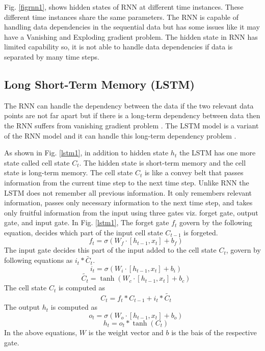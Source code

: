 \documentclass[preprint,12pt]{elsarticle}
\begin{document}
Fig. \ref{figrnn1}, shows hidden states of RNN at different time instances. These different time instances share the same parameters. The RNN is capable of handling data dependencies in the sequential data but has some issues like it may have a Vanishing and Exploding gradient problem. The hidden state in RNN has limited capability so, it is not able to handle data dependencies if data is separated by many time steps.
\subsection{Long Short-Term Memory (LSTM)}
The RNN can handle the dependency between the data if the two relevant data points are not far apart but if there is a long-term dependency between data then the RNN suffers from vanishing gradient problem \cite{bengio1994learning}. The LSTM model is a variant of the RNN model and it can handle this long-term dependency problem \cite{hochreiter1997long}.
\par As shown in Fig. \ref{lstm1}, in addition to hidden state $h_t$ the LSTM has one more state called cell state $C_t$. The hidden state is short-term memory and the cell state is long-term memory. The cell state $C_t$ is like a convey belt that passes information from the current time step to the next time step. Unlike RNN the LSTM does not remember all previous information. It only remembers relevant information, passes only necessary information to the next time step, and takes only fruitful information from the input using three gates viz. forget gate, output gate, and input gate. In Fig. \ref{lstm1}, The forget gate $f_t$ govern by the following equation, decides which part of the input cell state $C_{t-1}$ is forgeted.
\begin{equation}
	\quad f_t = \sigma(W_{f} \cdot [h_{t-1},x_t] + b_{f})
\end{equation}
The input gate decides this part of the input added to the cell state $C_{t}$, govern by following equations as $i_t\ast \tilde{C_t}$.
\begin{equation}
	\quad i_t = \sigma(W_{i} \cdot [h_{t-1},x_t] + b_{i})
\end{equation}
\begin{equation}
	\quad \tilde{C_t}= \tanh(W_{c} \cdot [h_{t-1},x_t] + b_{c})
\end{equation}
The cell state ${C_t}$ is computed as 
\begin{equation}
	\quad {C_t}= f_t\ast {C_{t-1}} + i_t\ast \tilde{C_t}
\end{equation}
The output $h_t$ is computed as
\begin{equation}
	\quad {o_t}= \sigma(W_{o} \cdot [h_{t-1},x_t] + b_{o})
\end{equation}
\begin{equation}
	\quad {h_t}= {o_t}\ast  \tanh(C_t)
\end{equation}
In the above equations, $W$ is the weight vector and $b$ is the bais of the respective gate.
\end{document}
